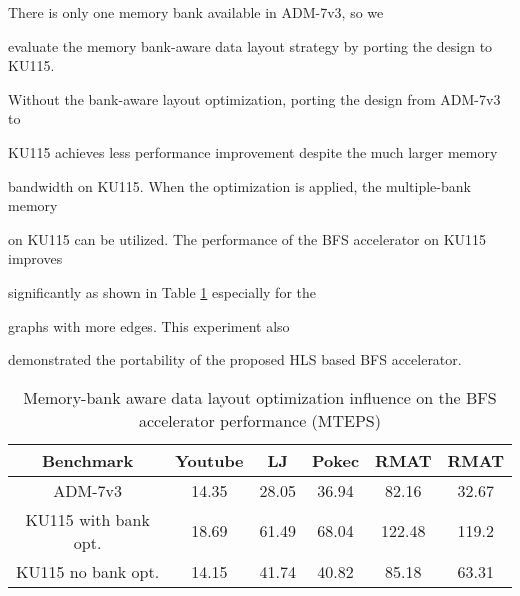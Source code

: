 There is only one memory bank available in ADM-7v3, so we 

evaluate the memory bank-aware data layout strategy by porting the design to KU115.

Without the bank-aware layout optimization, porting the design from ADM-7v3 to 

KU115 achieves less performance improvement despite the much larger memory 

bandwidth on KU115. When the optimization is applied, the multiple-bank memory 

on KU115 can be utilized. The performance of the BFS accelerator on KU115 improves 

significantly as shown in Table \ref{tab:porting-summary} especially for the 

graphs with more edges. This experiment also 

demonstrated the portability of the proposed HLS based BFS accelerator.

\begin{table}

	\vspace{-0.5em}

    \centering

	\caption{Memory-bank aware data layout optimization influence on the BFS accelerator performance (MTEPS)}

  \label{tab:porting-summary}

  \vspace{-0.3em}

  \begin{tabular}{cccccc}

    \toprule

	Benchmark & Youtube & LJ & Pokec & RMAT\uppercase\expandafter{\romannumeral1} & RMAT\uppercase\expandafter{\romannumeral2} \\

    \midrule

	ADM-7v3 & 14.35 & 28.05 & 36.94 & 82.16 & 32.67 \\

	KU115 with bank opt. & 18.69 & 61.49 & 68.04 & 122.48 & 119.2 \\

	KU115 no bank opt. & 14.15 & 41.74 & 40.82 & 85.18 & 63.31\\

  \bottomrule

\end{tabular}

\vspace{-1em}

\end{table}





